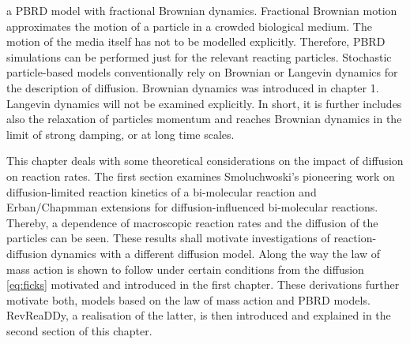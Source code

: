\documentclass[
  a4paper,BCOR10mm,oneside,
  headsepline,footsepline,%
  fleqn,openbib
]{scrbook}
\begin{document}
a PBRD model with fractional Brownian dynamics. Fractional Brownian motion approximates the motion of a particle in a crowded biological medium. The motion of the media itself has not to be modelled explicitly. Therefore, PBRD simulations can be performed just for the relevant reacting particles. Stochastic particle-based models conventionally rely on Brownian or Langevin dynamics for the description of diffusion. Brownian dynamics was introduced in chapter 1. Langevin dynamics will not be examined explicitly. In short, it is further includes also the relaxation of particles momentum and reaches Brownian dynamics in the limit of strong damping, or at long time scales.\par
This chapter deals with some theoretical considerations on the impact of diffusion on reaction rates. The first section examines Smoluchwoski's pioneering work \cite{Smoluchowski1} on diffusion-limited reaction kinetics of a bi-molecular reaction and Erban/Chapmman extensions \cite{Erban2009} for diffusion-influenced bi-molecular reactions. Thereby, a dependence of macroscopic reaction rates and the diffusion of the particles can be seen. These results shall motivate investigations of reaction-diffusion dynamics with a different diffusion model. Along the way the law of mass action is shown to follow under certain conditions from the diffusion \cref{eq:ficks} motivated and introduced in the first chapter. These derivations further motivate both, models based on the law of mass action and PBRD models. RevReaDDy, a realisation of the latter, is then introduced and explained in the second section of this chapter.
\end{document}
